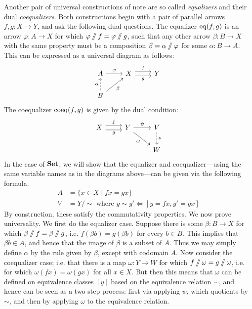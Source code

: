 Another pair of universal constructions of note are so called \emph{equalizers} and their dual \emph{coequalizers}. Both constructions begin with a pair of parallel arrows $f,g:X\to Y$, and ask the following dual questions. The equalizer $\operatorname{eq}(f,g)$ is an arrow $\varphi:A\to X$ for which $\varphi\sslash f=\varphi\sslash g$, such that any other arrow $\beta:B\to X$ with the same property must be a composition $\beta=\alpha\sslash\varphi$ for some $\alpha:B\to A$. This can be expressed as a universal diagram as follows:
\[
\begin{tikzcd}
A \arrow[r,"\varphi"] & X \arrow[r,"f",shift left=0.7ex] \arrow[r,"g"',shift left=-0.7ex] & Y \\
B \arrow[ur,"\beta"'] \arrow[u,dashed,"\alpha"]
\end{tikzcd}
\]
The coequalizer $\operatorname{coeq}(f,g)$ is given by the dual condition:
\[
\begin{tikzcd}
X \arrow[r,"f",shift left=0.7ex] \arrow[r,"g"',shift left=-0.7ex] & Y \arrow[dr,"\omega"'] \arrow[r,"\psi"] & V \arrow[d,dashed,"\nu"]  \\
&& W
\end{tikzcd}
\]
In the case of $\mathbf{Set}$, we will show that the equalizer and coequalizer---using the same variable names as in the diagrams above---can be given via the following formula. 
\begin{align*}
A &= \{x\in X\mid fx = gx\} \\
V &= Y/\sim\text{ where }  y\sim y' \Leftrightarrow [y=fx,y'=gx]
\end{align*}
By construction, these satisfy the commutativity properties. We now prove universality. We first do the equalizer case. Suppose there is some $\beta : B\to X$ for which $\beta\sslash f=\beta\sslash g$, i.e. $f(\beta b)=g(\beta b)$ for every $b\in B$. This implies that $\beta b\in A$, and hence that the image of $\beta$ is a subset of $A$. Thus we may simply define $\alpha$ by the rule given by $\beta$, except with codomain $A$. Now consider the coequalizer case; i.e. that there is a map $\omega : Y\to W$ for which $f\sslash \omega = g\sslash\omega$, i.e. for which $\omega (fx) = \omega (g x)$ for all $x\in X$. But then this means that $\omega$ can be defined on equivalence classes $[y]$ based on the equivalence relation $\sim$, and hence can be seen as a two step process: first via applying $\psi$, which quotients by $\sim$, and then by applying $\omega$ to the equivalence relation.


